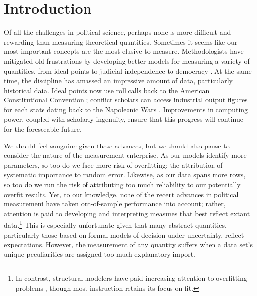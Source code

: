 \section{Introduction}

Of all the challenges in political science, perhaps none is more difficult and rewarding than measuring theoretical quantities. 
Sometimes it seems like our most important concepts are the most elusive to measure. 
Methodologists have mitigated old frustrations by developing better models for measuring a variety of quantities, from ideal points \citep{clinton2004} to judicial independence \citep{linzer2014} to democracy \citep{jackman2008}. 
At the same time, the discipline has amassed an impressive amount of data, particularly historical data. 
Ideal points now use roll calls back to the American Constitutional Convention \citep{heckelman2013}; conflict scholars can access industrial output figures for each state dating back to the Napoleonic Wars \citep{singer1972}. 
Improvements in computing power, coupled with scholarly ingenuity, ensure that this progress will continue for the foreseeable future.


We should feel sanguine given these advances, but we should also pause to consider the nature of the measurement enterprise. 
As our models identify more parameters, so too do we face more risk of overfitting: the attribution of systematic importance to random error. 
Likewise, as our data spans more rows, so too do we run the risk of attributing too much reliability to our potentially overfit results. 
Yet, to our knowledge, none of the recent advances in political measurement have taken out-of-sample performance into account; rather, attention is paid to developing and interpreting measures that best reflect extant data.\footnote{In contrast, structural modelers have paid increasing attention to overfitting problems \citep{pitt2002,preacher2006}, though most instruction retains its focus on fit.} 
This is especially unfortunate given that many abstract quantities, particularly those based on formal models of decision under uncertainty, reflect expectations. 
However, the measurement of any quantity suffers when a data set's unique peculiarities are assigned too much explanatory import.

